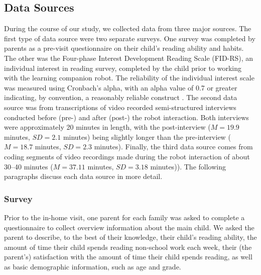 \documentclass{sigchi}
\begin{document}
\subsection{Data Sources}
During the course of our study, we collected data from three major sources. The first type of data source were two separate surveys. One survey was completed by parents as a pre-visit questionnaire on their child's reading ability and habits. The other was the Four-phase Interest Development Reading Scale (FID-RS), an individual interest in reading survey, completed by the child prior to working with the learning companion robot. The reliability of the individual interest scale was measured using Cronbach's alpha, with an alpha value of 0.7 or greater indicating, by convention, a reasonably reliable construct \cite{Crocker:2009}. The second data source was from transcriptions of video recorded semi-structured interviews conducted before (pre-) and after (post-) the robot interaction. Both interviews were approximately 20 minutes in length, with the post-interview ($M = 19.9$ minutes, $SD = 2.1$ minutes) being slightly longer than the pre-interview ($M = 18.7$ minutes, $SD = 2.3$ minutes). Finally, the third data source comes from coding segments of video recordings made during the robot interaction of about 30--40 minutes ($M = 37.11$ minutes, $SD = 3.18$ minutes)). The following paragraphs discuss each data source in more detail.


\subsubsection{Survey}
Prior to the in-home visit, one parent for each family was asked to complete a questionnaire to collect overview information about the main child. We asked the parent to describe, to the best of their knowledge, their child's reading ability, the amount of time their child spends reading non-school work each week, their (the parent's) satisfaction with the amount of time their child spends reading, as well as basic demographic information, such as age and grade.
 
\end{document}
